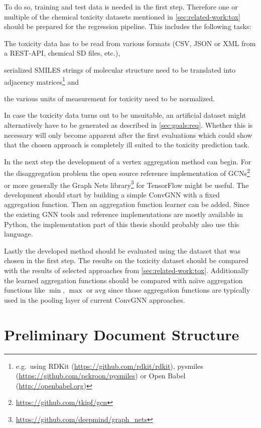 \documentclass[12pt]{scrartcl}
\begin{document}
To do so, training and test data is needed in the first step.
Therefore one or multiple of the chemical toxicity datasets mentioned in \cref{sec:related-work:tox} should be prepared for the regression pipeline.
This includes the following tasks:
\begin{enumerate*}
	\item The toxicity data has to be read from various formats (CSV, JSON or XML from a REST-API, chemical SD files, etc.),
	\item serialized SMILES strings of molecular structure need to be translated into adjacency matrices\footnote{e.g.\ using RDKit (\url{https://github.com/rdkit/rdkit}), pysmiles (\url{https://github.com/pckroon/pysmiles}) or Open Babel (\url{http://openbabel.org})} and
	\item the various units of measurement for toxicity need to be normalized.
\end{enumerate*}
In case the toxicity data turns out to be unsuitable, an artificial dataset might alternatively have to be generated as described in \cref{sec:goals:req}.
Whether this is necessary will only become apparent after the first evaluations which could show that the chosen approach is completely ill suited to the toxicity prediction task.

In the next step the development of a vertex aggregation method can begin.
For the disaggregation problem the open source reference implementation of GCNs\footnote{\url{https://github.com/tkipf/gcn}} or more generally the Graph Nets library\footnote{\url{https://github.com/deepmind/graph_nets}} for TensorFlow might be useful.
The development should start by building a simple ConvGNN with a fixed aggregation function.
Then an aggregation function learner can be added.
Since the existing GNN tools and reference implementations are mostly available in Python, the implementation part of this thesis should probably also use this language.

Lastly the developed method should be evaluated using the dataset that was chosen in the first step.
The results on the toxicity dataset should be compared with the results of selected approaches from \cref{sec:related-work:tox}.
Additionally the learned aggregation functions should be compared with na{\"\i}ve aggregation functions like $\min$, $\max$ or $\text{avg}$ since those aggregation functions are typically used in the pooling layer of current ConvGNN approaches.

\section{Preliminary Document Structure}%
\label{sec:doc-structure}
\end{document}
